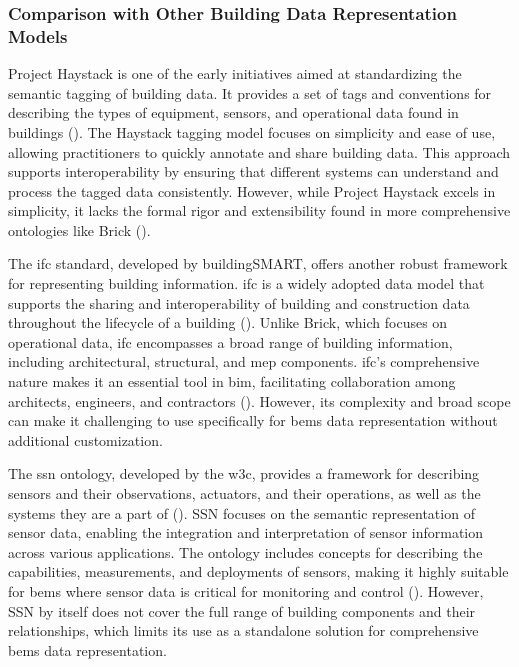 \subsubsection*{Comparison with Other Building Data Representation Models}
Project Haystack is one of the early initiatives aimed at standardizing the semantic tagging of building data.
It provides a set of tags and conventions for describing the types of equipment, sensors, and operational data found in buildings (\cite{projecthaystack}).
The Haystack tagging model focuses on simplicity and ease of use, allowing practitioners to quickly annotate and share building data.
This approach supports interoperability by ensuring that different systems can understand and process the tagged data consistently.
However, while Project Haystack excels in simplicity, it lacks the formal rigor and extensibility found in more comprehensive ontologies like Brick (\cite{projecthaystack}).

The \gls{ifc} standard, developed by buildingSMART, offers another robust framework for representing building information.
\gls{ifc} is a widely adopted data model that supports the sharing and interoperability of building and construction data throughout the lifecycle of a building (\cite{Liu2021}).
Unlike Brick, which focuses on operational data, \gls{ifc} encompasses a broad range of building information, including architectural, structural, and \gls{mep} components.
\gls{ifc}'s comprehensive nature makes it an essential tool in \gls{bim}, facilitating collaboration among architects, engineers, and contractors (\cite{Liu2021}).
However, its complexity and broad scope can make it challenging to use specifically for \gls{bems} data representation without additional customization.

The \gls{ssn} ontology, developed by the \gls{w3c}, provides a framework for describing sensors and their observations, actuators, and their operations, as well as the systems they are a part of (\cite{Compton2012}).
SSN focuses on the semantic representation of sensor data, enabling the integration and interpretation of sensor information across various applications.
The ontology includes concepts for describing the capabilities, measurements, and deployments of sensors, making it highly suitable for \gls{bems} where sensor data is critical for monitoring and control (\cite{Compton2012}).
However, SSN by itself does not cover the full range of building components and their relationships, which limits its use as a standalone solution for comprehensive \gls{bems} data representation.

